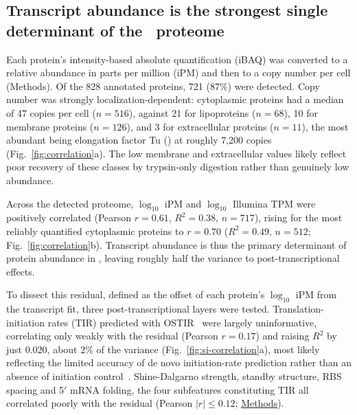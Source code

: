 \subsection{Transcript abundance is the strongest single determinant of the \syn~proteome}

Each protein's intensity-based absolute quantification (iBAQ) was converted to a relative abundance in parts per million (iPM) and then to a copy number per cell (Methods).
Of the 828 annotated proteins, 721 (87\%) were detected.
Copy number was strongly localization-dependent: cytoplasmic proteins had a median of 47 copies per cell ($n = 516$), against 21 for lipoproteins ($n = 68$), 10 for membrane proteins ($n = 126$), and 3 for extracellular proteins ($n = 11$), the most abundant being elongation factor Tu () at roughly 7{,}200 copies (Fig.~\ref{fig:correlation}a).
The low membrane and extracellular values likely reflect poor recovery of these classes by trypsin-only digestion rather than genuinely low abundance.


Across the detected proteome, $\log_{10}$ iPM and $\log_{10}$ Illumina TPM were positively correlated (Pearson $r = 0.61$, $R^{2} = 0.38$, $n = 717$), rising for the most reliably quantified cytoplasmic proteins to $r = 0.70$ ($R^{2} = 0.49$, $n = 512$; Fig.~\ref{fig:correlation}b).
Transcript abundance is thus the primary determinant of protein abundance in \syn, leaving roughly half the variance to post-transcriptional effects.

To dissect this residual, defined as the offset of each protein's $\log_{10}$ iPM from the transcript fit, three post-transcriptional layers were tested.
Translation-initiation rates (TIR) predicted with OSTIR~\cite{roots_ostir_2021} were largely uninformative, correlating only weakly with the residual (Pearson $r = 0.17$) and raising $R^{2}$ by just 0.020, about 2\% of the variance (Fig.~\ref{fig:si-correlation}a), most likely reflecting the limited accuracy of de novo initiation-rate prediction rather than an absence of initiation control~\cite{li_quantifying_2014}.
Shine-Dalgarno strength, standby structure, RBS spacing and 5$'$ mRNA folding, the four subfeatures constituting TIR all correlated poorly with the residual (Pearson $ \vert r \vert \leq 0.12$; \hyperref[method:corr-TIR]{Methods}).

